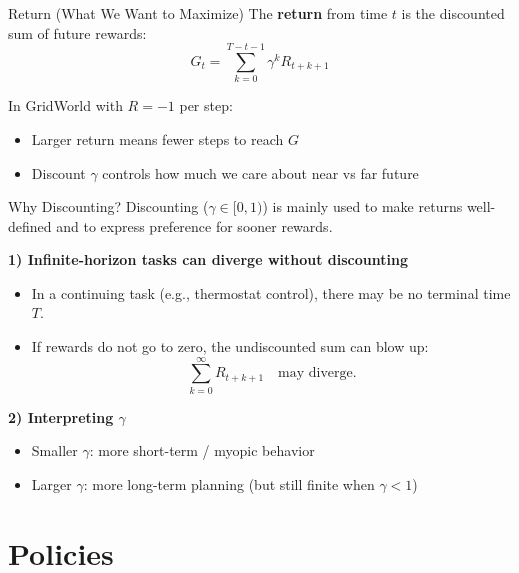 \documentclass[11pt]{beamer}
\begin{document}
\begin{frame}{Return (What We Want to Maximize)}
The \textbf{return} from time $t$ is the discounted sum of future rewards:
\[
G_t = \sum_{k=0}^{T-t-1} \gamma^k R_{t+k+1}
\]

\vspace{6pt}
In GridWorld with $R=-1$ per step:
\begin{itemize}
  \item Larger return means fewer steps to reach $G$
  \item Discount $\gamma$ controls how much we care about near vs far future
\end{itemize}
\end{frame}


\begin{frame}{Why Discounting?}
Discounting ($\gamma \in [0,1)$) is mainly used to make returns well-defined and to express preference for sooner rewards.

\vspace{3pt}

\textbf{1) Infinite-horizon tasks can diverge without discounting}
\begin{itemize}
  \item In a continuing task (e.g., thermostat control), there may be no terminal time $T$.
  \item If rewards do not go to zero, the undiscounted sum can blow up:
  \[
    \sum_{k=0}^{\infty} R_{t+k+1} \quad \text{may diverge.}
  \]
\end{itemize}

\vspace{3pt}

\textbf{2) Interpreting $\gamma$}
\begin{itemize}
  \item Smaller $\gamma$: more short-term / myopic behavior
  \item Larger $\gamma$: more long-term planning (but still finite when $\gamma<1$)
\end{itemize}

\end{frame}

\section{Policies}
\end{document}
